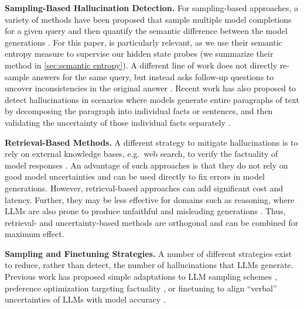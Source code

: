 \documentclass{article}
\begin{document}
\textbf{Sampling-Based Hallucination Detection.}
For sampling-based approaches, a variety of methods have been proposed that sample multiple model completions for a given query and then quantify the semantic difference between the model generations \citep{kuhn2023semantic,kadavath2022language,duan2023shifting,cole2023selectively,chen2023quantifying,elaraby2023halo}.
For this paper, \citet{farquhar2024detecting} is particularly relevant, as we use their semantic entropy measure to supervise our hidden state probes (we summarize their method in \cref{sec:semantic entropy}).
A different line of work does not directly re-sample answers for the same query, but instead asks follow-up questions to uncover inconsistencies in the original answer \citep{dhuliawala2023chain,agrawal2023language}.
Recent work has also proposed to detect hallucinations in scenarios where models generate entire paragraphs of text by decomposing the paragraph into individual facts or sentences, and then validating the uncertainty of those individual facts separately \citep{luo2023zero, mundler2023self, manakul2023selfcheckgpt,dhuliawala2023chain}.

\textbf{Retrieval-Based Methods.}
A different strategy to mitigate hallucinations is to rely on external knowledge bases, e.g.~web search, to verify the factuality of model responses \citep{feldman2023trapping,zhang2023mitigating,
peng2023check,dziri2021neural,gao2022rarr,li2023chain,varshneystitch,su2022read}.
An advantage of such approaches is that they do not rely on good model uncertainties and can be used directly to fix errors in model generations.
However, retrieval-based approaches can add significant cost and latency.
Further, they may be less effective for domains such as reasoning, where LLMs are also prone to produce unfaithful and misleading generations \citep{turpin2024language,lanham2023measuring}.
Thus, retrieval- and uncertainty-based methods are orthogonal and can be combined for maximum effect.


\textbf{Sampling and Finetuning Strategies.}
A number of different strategies exist to reduce, rather than detect, the number of hallucinations that LLMs generate.
Previous work has proposed simple adaptations to LLM sampling schemes \citep{lee2022factuality,chuang2023dola,shi2023trusting}, preference optimization targeting factuality \citep{tian2023finetuning}, or finetuning to align ``verbal'' uncertainties of LLMs with model accuracy \citep{mielke2020linguistic,lin2022teaching,band2024linguistic}.
\end{document}

